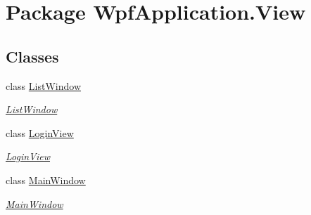 \hypertarget{namespace_wpf_application_1_1_view}{\section{Package Wpf\-Application.\-View}
\label{namespace_wpf_application_1_1_view}
}
\subsection*{Classes}
\begin{DoxyCompactItemize}
\item 
class \hyperlink{class_wpf_application_1_1_view_1_1_list_window}{List\-Window}
\begin{DoxyCompactList}\small\item\em \hyperlink{class_wpf_application_1_1_view_1_1_list_window}{List\-Window} \end{DoxyCompactList}\item 
class \hyperlink{class_wpf_application_1_1_view_1_1_login_view}{Login\-View}
\begin{DoxyCompactList}\small\item\em \hyperlink{class_wpf_application_1_1_view_1_1_login_view}{Login\-View} \end{DoxyCompactList}\item 
class \hyperlink{class_wpf_application_1_1_view_1_1_main_window}{Main\-Window}
\begin{DoxyCompactList}\small\item\em \hyperlink{class_wpf_application_1_1_view_1_1_main_window}{Main\-Window} \end{DoxyCompactList}\end{DoxyCompactItemize}
